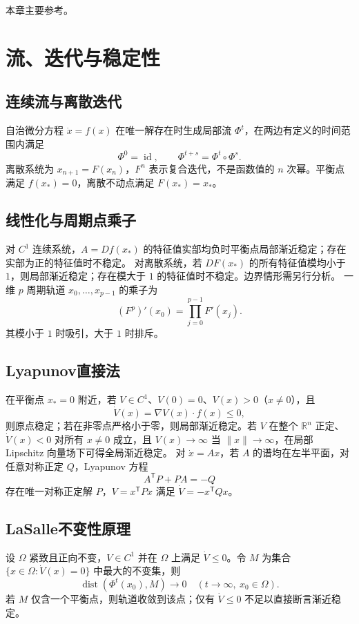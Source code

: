 \documentclass[../main.tex]{subfiles}
\begin{document}
本章主要参考\cite{teschl}。

\section{流、迭代与稳定性}
\subsection{连续流与离散迭代}
自治微分方程 $\dot x=f(x)$ 在唯一解存在时生成局部流 $\Phi^t$，在两边有定义的时间范围内满足
\[
\Phi^0=\operatorname{id},\qquad\Phi^{t+s}=\Phi^t\circ\Phi^s.
\]
离散系统为 $x_{n+1}=F(x_n)$，$F^n$ 表示复合迭代，不是函数值的 $n$ 次幂。平衡点满足 $f(x_*)=0$，离散不动点满足 $F(x_*)=x_*$。
\subsection{线性化与周期点乘子}
对 $C^1$ 连续系统，$A=Df(x_*)$ 的特征值实部均负时平衡点局部渐近稳定；存在实部为正的特征值时不稳定。
对离散系统，若 $DF(x_*)$ 的所有特征值模均小于 $1$，则局部渐近稳定；存在模大于 $1$ 的特征值时不稳定。边界情形需另行分析。
一维 $p$ 周期轨道 $x_0,\ldots,x_{p-1}$ 的乘子为
\[
(F^p)'(x_0)=\prod_{j=0}^{p-1}F'(x_j).
\]
其模小于 $1$ 时吸引，大于 $1$ 时排斥。
\subsection{Lyapunov直接法}
在平衡点 $x_*=0$ 附近，若 $V\in C^1$、$V(0)=0$、$V(x)>0$（$x\ne0$），且
\[
\dot V(x)=\nabla V(x)\cdot f(x)\le0,
\]
则原点稳定；若在非零点严格小于零，则局部渐近稳定。若 $V$ 在整个 $\mathbb R^n$ 正定、$\dot V(x)<0$ 对所有 $x\ne0$ 成立，且 $V(x)\to\infty$ 当 $\|x\|\to\infty$，在局部 Lipschitz 向量场下可得全局渐近稳定。
对 $\dot x=Ax$，若 $A$ 的谱均在左半平面，对任意对称正定 $Q$，Lyapunov 方程
\[
A^{\mathsf T}P+PA=-Q
\]
存在唯一对称正定解 $P$，$V=x^{\mathsf T}Px$ 满足 $\dot V=-x^{\mathsf T}Qx$。
\subsection{LaSalle不变性原理}
设 $\Omega$ 紧致且正向不变，$V\in C^1$ 并在 $\Omega$ 上满足 $\dot V\le0$。令 $M$ 为集合 $\{x\in\Omega:\dot V(x)=0\}$ 中最大的不变集，则
\[
\operatorname{dist}(\Phi^t(x_0),M)\to0\quad(t\to\infty,\ x_0\in\Omega).
\]
若 $M$ 仅含一个平衡点，则轨道收敛到该点；仅有 $\dot V\le0$ 不足以直接断言渐近稳定。
\end{document}
